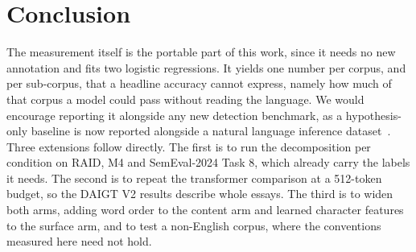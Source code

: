 \section{Conclusion}
\label{sec:conclusion}

The measurement itself is the portable part of this work, since it needs no new annotation and fits two logistic regressions. It yields one number per corpus, and per sub-corpus, that a headline accuracy cannot express, namely how much of that corpus a model could pass without reading the language. We would encourage reporting it alongside any new detection benchmark, as a hypothesis-only baseline is now reported alongside a natural language inference dataset~\cite{Poliak2018hypothesis}. Three extensions follow directly. The first is to run the decomposition per condition on RAID, M4 and SemEval-2024 Task 8, which already carry the labels it needs. The second is to repeat the transformer comparison at a 512-token budget, so the DAIGT V2 results describe whole essays. The third is to widen both arms, adding word order to the content arm and learned character features to the surface arm, and to test a non-English corpus, where the conventions measured here need not hold.
